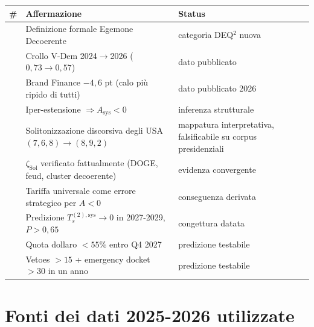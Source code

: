 {\def\LTcaptype{none} %
{\small\begin{longtable}[]{@{}
  >{\raggedright\arraybackslash}p{}
  >{\raggedright\arraybackslash}p{}
  >{\raggedright\arraybackslash}p{}@{}}
\toprule\noalign{}
\begin{minipage}[b]{\linewidth}\raggedright
\#
\end{minipage} & \begin{minipage}[b]{\linewidth}\raggedright
Affermazione
\end{minipage} & \begin{minipage}[b]{\linewidth}\raggedright
Status
\end{minipage} \\
\midrule\noalign{}
\endhead
\bottomrule\noalign{}
\endlastfoot
1 & Definizione formale Egemone Decoerente & \Hypoth{} categoria DEQ$^2$
nuova \\
2 & Crollo V-Dem 2024$\to$2026 (\(0{,}73 \to 0{,}57\)) & \Proved{} dato
pubblicato \\
3 & Brand Finance \(-4{,}6\) pt (calo più ripido di tutti) & \Proved{}
dato pubblicato 2026 \\
4 & Iper-estensione \(\Rightarrow A_{\text{sys}} < 0\) & \Hypoth{}
inferenza strutturale \\
5 & Solitonizzazione discorsiva degli USA \((7,6,8) \to (8,9,2)\) &
\Conj{} mappatura interpretativa, falsificabile su corpus
presidenziali \\
6 & \(\zeta_{\text{Sol}}\) verificato fattualmente (DOGE, feud, cluster
decoerente) & \Proved{} evidenza convergente \\
7 & Tariffa universale come errore strategico per \(A < 0\) & \Hypoth{}
conseguenza derivata \\
8 & Predizione \(T_s^{(2),\text{sys}} \to 0\) in 2027-2029,
\(P > 0{,}65\) & \Conj{} congettura datata \\
9 & Quota dollaro \(< 55\%\) entro Q4 2027 & \Conj{} predizione
testabile \\
10 & Vetoes \(> 15\) + emergency docket \(> 30\) in un anno & \Conj{}
predizione testabile \\
\end{longtable}}
}



\section{Fonti dei dati 2025-2026
utilizzate}\label{fonti-dei-dati-2025-2026-utilizzate}

